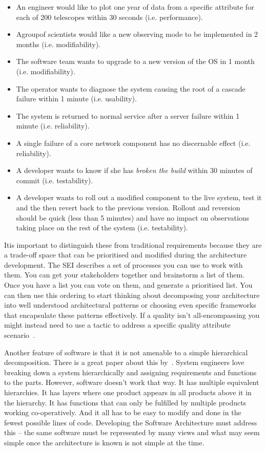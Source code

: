\documentclass[11pt,twoside]{article}
\begin{document}
\begin{itemize}
	\item An engineer would like to plot one year of data from a specific attribute for each 
of 200 telescopes within 30 seconds (i.e. performance).
	\item Agroupof scientists would like a new observing mode to be implemented in 2 
months (i.e. modifiability). 
	\item The software team wants to upgrade to a new version of the OS in 1 month (i.e. 
modifiability). 
	\item The operator wants to diagnose the system causing the root of a cascade failure 
within 1 minute (i.e. usability). 
	\item The system is returned to normal service after a server failure within 1 minute 
(i.e. reliability). 
	\item A single failure of a core network component has no discernable effect (i.e. reliability). 
	\item A developer wants to know if she has \emph{broken the build} within 30 minutes of 
commit (i.e. testability).
	\item A developer wants to roll out a modified component to the live system, test it 
and the then revert back to the previous version. Rollout and reversion should be 
quick (less than 5 minutes) and have no impact on observations taking place on 
the rest of the system (i.e. testability). 
\end{itemize}

Itis important to distinguish these from traditional requirements because they are a 
trade-off space that can be prioritised and modified during the architecture development. 
The SEI describes a set of processes you can use to work with them. You can get your 
stakeholders together and brainstorm a list of them. Once you have a list you can vote 
on them, and generate a prioritised list. You can then use this ordering to start thinking 
about decomposing your architecture into well understood architectural patterns or 
choosing even specific frameworks that encapsulate these patterns effectively. If a quality 
isn't all-encompassing you might instead need to use a tactic to address a specific 
quality attribute scenario~\cite[see][]{clements2001,bass2012,cervantes2016}. 

Another feature of software is that it is not amenable to a simple hierarchical decomposition. 
There is a great paper about this by~\citet{maier2006}. System 
engineers love breaking down a system hierarchically and assigning requirements and 
functions to the parts. However, software doesn't work that way. It has multiple equivalent 
hierarchies. It has layers where one product appears in all products above it in 
the hierarchy. It has functions that can only be fulfilled by multiple products working 
co-operatively. And it all has to be easy to modify and done in the fewest possible lines 
of code. Developing the Software Architecture must address this -- the same software 
must be represented by many views and what may seem simple once the architecture is 
known is not simple at the time. 
\end{document}
